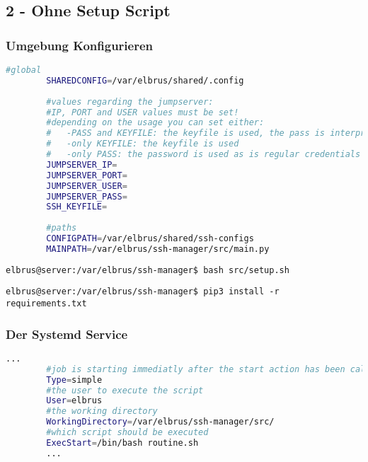 	\subsection{2 - Ohne Setup Script}
	\subsubsection[file config]{Umgebung Konfigurieren}
	\lstset{style=files}
	\begin{lstlisting}[caption={Anhand von '.env.example' eigene '.env' Datei anlegen.}, language=bash]
		#global
		SHAREDCONFIG=/var/elbrus/shared/.config
		
		#values regarding the jumpserver:
		#IP, PORT and USER values must be set!
		#depending on the usage you can set either:
		#   -PASS and KEYFILE: the keyfile is used, the pass is interpreted as the passphrase
		#   -only KEYFILE: the keyfile is used
		#   -only PASS: the password is used as is regular credentials
		JUMPSERVER_IP=
		JUMPSERVER_PORT=
		JUMPSERVER_USER=
		JUMPSERVER_PASS=
		SSH_KEYFILE=
		
		#paths
		CONFIGPATH=/var/elbrus/shared/ssh-configs
		MAINPATH=/var/elbrus/ssh-manager/src/main.py
	\end{lstlisting}
	
	\lstset{style=commands}	
	\begin{lstlisting}[caption={Ausführen des Scripts zur Initialisierung des VCS Verzeichnisses.}]
		elbrus@server:/var/elbrus/ssh-manager$ bash src/setup.sh
	\end{lstlisting}
	
	\lstset{style=commands}
	\begin{lstlisting}[caption={Installieren von fehlenden python3 Packages.}]
		elbrus@server:/var/elbrus/ssh-manager$ pip3 install -r requirements.txt
	\end{lstlisting}
	\newpage
	
	\subsubsection[systemd service]{Der Systemd Service}
	
	\lstset{style=files}
	\begin{lstlisting}[caption={ssh-manager.service.example - Die Variable 'WorkingDirectory' sowie die Variable 'User' anpassen.},language=bash ,keywords={WorkingDirectory, User}, keywordstyle=\color{red}, firstnumber=5]
		...
		#job is starting immediatly after the start action has been called
		Type=simple
		#the user to execute the script
		User=elbrus
		#the working directory
		WorkingDirectory=/var/elbrus/ssh-manager/src/
		#which script should be executed
		ExecStart=/bin/bash routine.sh
		...
	\end{lstlisting}
	
